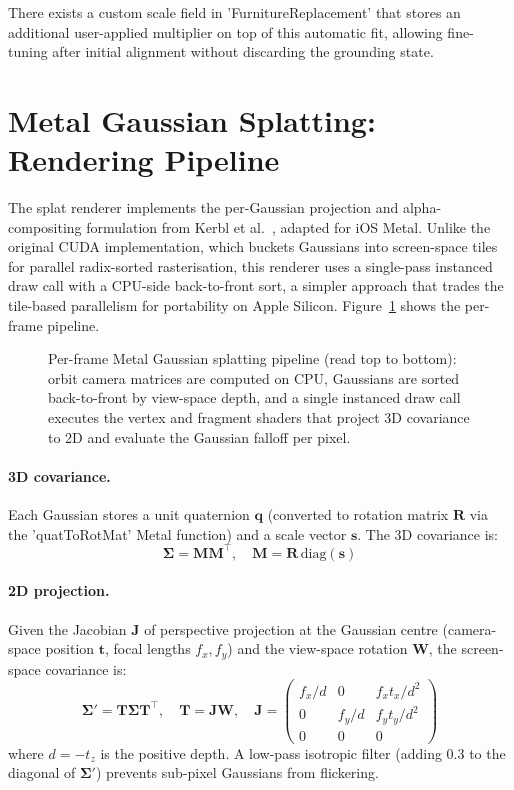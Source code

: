There exists a custom scale field in 'FurnitureReplacement' that stores an additional user-applied multiplier on top of this automatic fit, allowing fine-tuning after initial alignment without discarding the grounding state.

\section{Metal Gaussian Splatting: Rendering Pipeline}
\label{sec:splat_rendering}

The splat renderer implements the per-Gaussian projection and
alpha-compositing formulation from Kerbl et al.\ \cite{kerbl20233dgs},
adapted for iOS Metal. Unlike the original CUDA implementation, which
buckets Gaussians into screen-space tiles for parallel radix-sorted
rasterisation, this renderer uses a single-pass instanced draw call with
a CPU-side back-to-front sort, a simpler approach that trades the
tile-based parallelism for portability on Apple Silicon.
Figure~\ref{fig:splat_pipeline} shows the per-frame pipeline.

\begin{figure}[H]
\centering
\resizebox{0.92\textwidth}{!}{%

}
\caption{Per-frame Metal Gaussian splatting pipeline (read top to bottom): orbit camera matrices are computed on CPU, Gaussians are sorted back-to-front by view-space depth, and a single instanced draw call executes the vertex and fragment shaders that project 3D covariance to 2D and evaluate the Gaussian falloff per pixel.}
\label{fig:splat_pipeline}
\end{figure}

\paragraph{3D covariance.}
Each Gaussian stores a unit quaternion $\mathbf{q}$ (converted to rotation matrix $\mathbf{R}$ via the 'quatToRotMat' Metal function) and a scale vector $\mathbf{s}$. The 3D covariance is:
\[
    \boldsymbol{\Sigma} = \mathbf{M}\mathbf{M}^\top,\quad
    \mathbf{M} = \mathbf{R}\,\mathrm{diag}(\mathbf{s})
\]

\paragraph{2D projection.}
Given the Jacobian $\mathbf{J}$ of perspective projection at the Gaussian centre (camera-space position $\mathbf{t}$, focal lengths $f_x, f_y$) and the view-space rotation $\mathbf{W}$, the screen-space covariance is:
\[
    \boldsymbol{\Sigma}' = \mathbf{T}\boldsymbol{\Sigma}\mathbf{T}^\top,\quad
    \mathbf{T} = \mathbf{J}\mathbf{W},\quad
    \mathbf{J} = \begin{pmatrix} f_x/d & 0 & f_x t_x/d^2 \\ 0 & f_y/d & f_y t_y/d^2 \\ 0 & 0 & 0 \end{pmatrix}
\]
where $d = -t_z$ is the positive depth. A low-pass isotropic filter (adding 0.3 to the diagonal of $\boldsymbol{\Sigma}'$) prevents sub-pixel Gaussians from flickering.

